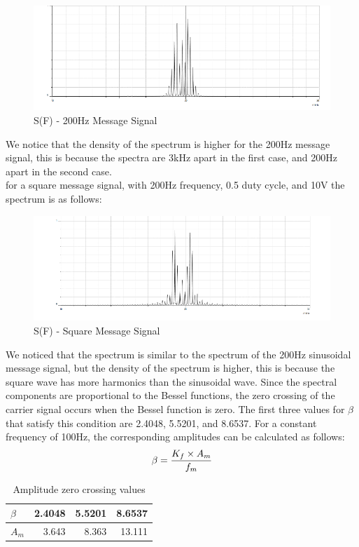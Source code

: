 \documentclass[12pt]{article}
\begin{document}
\begin{figure}[H]
    \centering
    \includegraphics[width=1\textwidth]{assets/200.png}
    \caption{S(F) - 200Hz Message Signal}
\end{figure}
We notice that the density of the spectrum is higher for the 200Hz message signal, this is because the spectra are 3kHz apart in the first case, and 200Hz apart in the second case.\\
for a square message signal, with 200Hz frequency, 0.5 duty cycle, and 10V the spectrum is as follows:
\begin{figure}[H]
    \centering
    \includegraphics[width=1\textwidth]{assets/square.png}
    \caption{S(F) - Square Message Signal}
\end{figure}
We noticed that the spectrum is similar to the spectrum of the 200Hz sinusoidal message signal, but the density of the spectrum is higher, this is because the square wave has more harmonics than the sinusoidal wave.
Since the spectral components are proportional to the Bessel functions, the zero crossing of the carrier signal occurs when the Bessel function is zero. The first three values for $\beta$ that satisfy this condition are 2.4048, 5.5201, and 8.6537. For a constant frequency of 100Hz, the corresponding amplitudes can be calculated as follows:
\begin{equation}
    \beta = {K_f \times A_m \over f_m}
    \label{HI}
\end{equation}
\begin{table}[H]
    \centering

    \begin{tabular}{l|r|r|r}
        \hline
        $\beta$ & 2.4048 & 5.5201 & 8.6537 \\\hline
        $A_m$ & 3.643 & 8.363 & 13.111 \\\hline
    \end{tabular}
    \caption{Amplitude zero crossing values}
\end{table}
\end{document}
